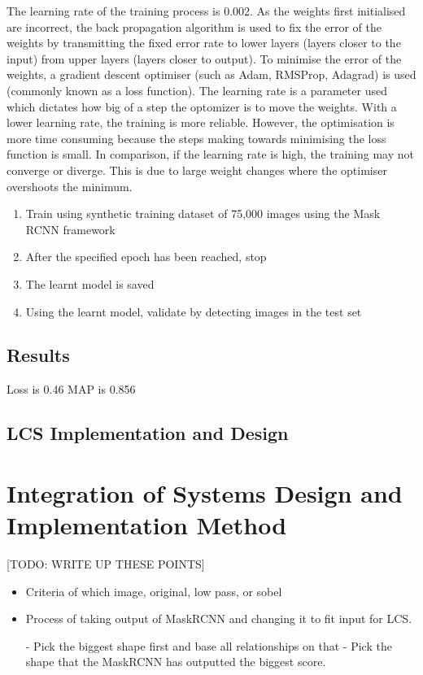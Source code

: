 The learning rate of the training process is 0.002. As the weights first initialised are incorrect, the back propagation algorithm is used to fix the error of the weights by transmitting the fixed error rate to lower layers (layers closer to the input) from upper layers (layers closer to output). To minimise the error of the weights, a gradient descent optimiser (such as Adam, RMSProp, Adagrad) is used (commonly known as a loss function). The learning rate is a parameter used which dictates how big of a step the optomizer is to move the weights. With a lower learning rate, the training is more reliable. However, the optimisation is more time consuming because the steps making towards minimising the loss function is small. In comparison, if the learning rate is high, the training may not converge or diverge. This is due to large weight changes where the optimiser overshoots the minimum.
\begin{enumerate}
	\item Train using synthetic training dataset of 75,000 images using the Mask RCNN framework
	\item After the specified epoch has been reached, stop
	\item The learnt model is saved 
	\item Using the learnt model, validate by detecting images in the test set
\end{enumerate}

\subsection{Results}
Loss is 0.46
MAP is 0.856

\subsection{LCS Implementation and Design}
\section{Integration of Systems Design and Implementation Method}

[TODO: WRITE UP THESE POINTS]
\begin{itemize}


	 \item Criteria of which image, original, low pass, or sobel
	 \item Process of taking output of MaskRCNN and changing it to fit input for LCS. 
	 
	 - Pick the biggest shape first and base all relationships on that
	 - Pick the shape that the MaskRCNN has outputted the biggest score.


\end{itemize}


